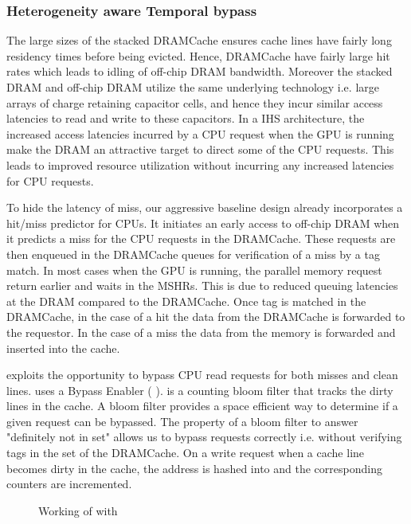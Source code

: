 \subsubsection{Heterogeneity aware Temporal bypass}
The large sizes of the stacked DRAMCache ensures cache lines have fairly long residency times before being evicted. Hence, DRAMCache have fairly large hit rates which leads to idling of off-chip DRAM bandwidth. Moreover the stacked DRAM and off-chip DRAM utilize the same underlying technology i.e. large arrays of charge retaining capacitor cells, and hence they incur similar access latencies to read and write to these capacitors.
In a IHS architecture, the increased access latencies incurred by a CPU request when the GPU is running make the DRAM an attractive target to direct some of the CPU requests. This leads to improved resource utilization without incurring any increased latencies for CPU requests. 
\par To hide the latency of miss, our aggressive baseline design already incorporates a hit/miss predictor for CPUs. It initiates an early access to off-chip DRAM when it predicts a miss for the CPU requests in the DRAMCache. These requests are then enqueued in the DRAMCache queues for verification of a miss by a tag match. 
In most cases when the GPU is running, the parallel memory request return earlier and waits in the MSHRs. This is due to reduced queuing latencies at the DRAM compared to the DRAMCache. Once tag is matched in the DRAMCache, in the case of a hit the data from the DRAMCache is forwarded to the requestor. In the case of a miss the data from the memory is forwarded and inserted into the cache. 
\par \cachename exploits the opportunity to bypass CPU read requests for both misses and clean lines. \cachename uses a Bypass Enabler ( \bypassname). \bypassname is a counting bloom filter \cite{bloom,counting-bloom} that tracks the dirty lines in the cache. A bloom filter provides a space efficient way to determine if a given request can be bypassed. The property of a bloom filter to answer "definitely not in set" allows us to bypass requests correctly i.e. without verifying tags in the set of the DRAMCache. 
On a write request when a cache line becomes dirty in the cache, the address is hashed into \bypassname and the corresponding counters are incremented. 
\begin{figure}[htb]
    \centering
    \bloom
    \caption{Working of \cachename with \bypassname }
    \label{fig:bye}
\end{figure}
